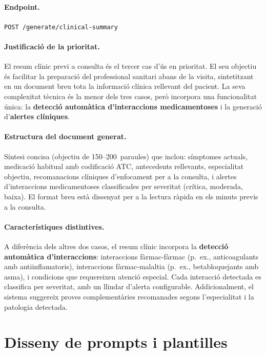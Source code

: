 \documentclass[CAT]{TFUOC}%
\begin{document}
\paragraph{Endpoint.} \texttt{POST /generate/clinical-summary}

\paragraph{Justificació de la prioritat.} El resum clínic previ a consulta és el tercer cas d'ús en prioritat. El seu objectiu és facilitar la preparació del professional sanitari abans de la visita, sintetitzant en un document breu tota la informació clínica rellevant del pacient. La seva complexitat tècnica és la menor dels tres casos, però incorpora una funcionalitat única: la \textbf{detecció automàtica d'interaccions medicamentoses} i la generació d'\textbf{alertes clíniques}.

\paragraph{Estructura del document generat.} Síntesi concisa (objectiu de 150--200~paraules) que inclou: símptomes actuals, medicació habitual amb codificació ATC, antecedents rellevants, especialitat objectiu, recomanacions clíniques d'enfocament per a la consulta, i alertes d'interaccions medicamentoses classificades per severitat (crítica, moderada, baixa). El format breu està dissenyat per a la lectura ràpida en els minuts previs a la consulta.

\paragraph{Característiques distintives.} A diferència dels altres dos casos, el resum clínic incorpora la \textbf{detecció automàtica d'interaccions}: interaccions fàrmac-fàrmac (p.~ex., anticoagulants amb antiinflamatoris), interaccions fàrmac-malaltia (p.~ex., betabloquejants amb asma), i condicions que requereixen atenció especial. Cada interacció detectada es classifica per severitat, amb un llindar d'alerta configurable. Addicionalment, el sistema suggereix proves complementàries recomanades segons l'especialitat i la patologia detectada.

\section{Disseny de prompts i plantilles}
\end{document}
